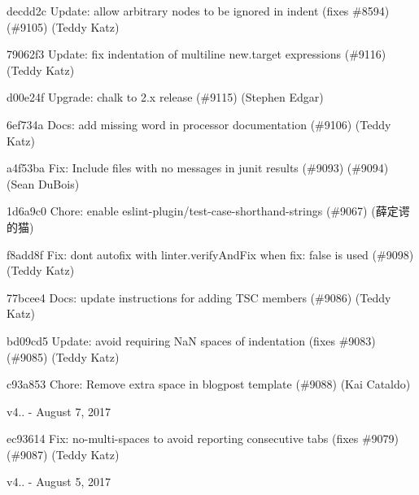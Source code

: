 \begin{DoxyItemize}
\item decdd2c Update\+: allow arbitrary nodes to be ignored in {\ttfamily indent} (fixes \#8594) (\#9105) (Teddy Katz)
\item 79062f3 Update\+: fix indentation of multiline {\ttfamily new.\+target} expressions (\#9116) (Teddy Katz)
\item d00e24f Upgrade\+: {\ttfamily chalk} to 2.\+x release (\#9115) (Stephen Edgar)
\item 6ef734a Docs\+: add missing word in processor documentation (\#9106) (Teddy Katz)
\item a4f53ba Fix\+: Include files with no messages in junit results (\#9093) (\#9094) (Sean Du\+Bois)
\item 1d6a9c0 Chore\+: enable eslint-\/plugin/test-\/case-\/shorthand-\/strings (\#9067) (薛定谔的猫)
\item f8add8f Fix\+: don\textquotesingle{}t autofix with linter.\+verify\+And\+Fix when {\ttfamily fix\+: false} is used (\#9098) (Teddy Katz)
\item 77bcee4 Docs\+: update instructions for adding TSC members (\#9086) (Teddy Katz)
\item bd09cd5 Update\+: avoid requiring NaN spaces of indentation (fixes \#9083) (\#9085) (Teddy Katz)
\item c93a853 Chore\+: Remove extra space in blogpost template (\#9088) (Kai Cataldo)
\end{DoxyItemize}

v4.. -\/ August 7, 2017


\begin{DoxyItemize}
\item ec93614 Fix\+: no-\/multi-\/spaces to avoid reporting consecutive tabs (fixes \#9079) (\#9087) (Teddy Katz)
\end{DoxyItemize}

v4.. -\/ August 5, 2017


